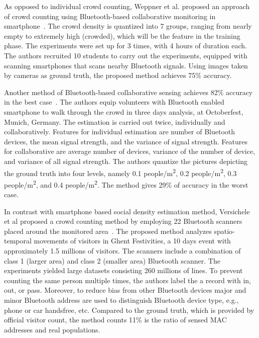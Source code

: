 	As opposed to individual crowd counting, Weppner et al. proposed an approach of crowd counting using Bluetooth-based collaborative monitoring in smartphone~\cite{thesis008}. The crowd density is quantized into 7 groups, ranging from nearly empty to extremely high (crowded), which will be the feature in the training phase. The experiments were set up for 3 times, with 4 hours of duration each. The authors recruited 10 students to carry out the experiments, equipped with scanning smartphones that scans nearby Bluetooth signals. Using images taken by cameras as ground truth, the proposed method achieves 75\% accuracy.
	

	Another method of Bluetooth-based collaborative sensing achieves 82\% accuracy in the best case~\cite{thesis041}. The authors equip volunteers with Bluetooth enabled smartphone to walk through the crowd in three days analysis, at Octoberfest, Munich, Germany. The estimation is carried out twice, individually and collaboratively. Features for individual estimation are number of Bluetooth devices, the mean signal strength, and the variance of signal strength. Features for collaborative are average number of devices, variance of the number of device, and variance of all signal strength. The authors quantize the pictures depicting the ground truth into four levels, namely 0.1 people/m\textsuperscript{2}, 0.2 people/m\textsuperscript{2}, 0.3 people/m\textsuperscript{2}, and 0.4 people/m\textsuperscript{2}. The method gives 29\% of accuracy in the worst case.

	In contrast with smartphone based social density estimation method, Versichele et al proposed a crowd counting method by employing 22 Bluetooth scanners placed around the monitored area~\cite{thesis016}. The proposed method analyzes spatio-temporal movements of visitors in Ghent Festivities, a 10 days event with approximately 1.5 millions of visitors. The scanners include a combination of class 1 (larger area) and class 2 (smaller area) Bluetooth scanner. The experiments yielded large datasets consisting 260 millions of lines. To prevent counting the same person multiple times, the authors label the a record with in, out, or pass. Moreover, to reduce bias from other Bluetooth devices major and minor Bluetooth address are used to distinguish Bluetooth device type, e.g., phone or car handsfree, etc. Compared to the ground truth, which is provided by official visitor count, the method counts 11\% is the ratio of sensed MAC addresses and real populations.

